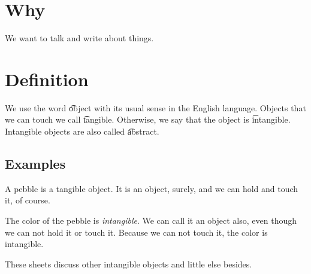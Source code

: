 
\section*{Why}

We want to talk and write about things.

\section*{Definition}

We use the word \t{object} with its usual sense in the English language.
Objects that we can touch we call \t{tangible}.
Otherwise, we say that the object is \t{intangible}.
Intangible objects are also called \t{abstract}.

\subsection*{Examples}

A pebble is a tangible object.
It is an object, surely, and we can hold and touch it, of course.

The color of the pebble is \textit{intangible}.
We can call it an object also, even though we can not hold it or touch it.
Because we can not touch it, the color is intangible.

These sheets discuss other intangible objects and little else besides.

\blankpage